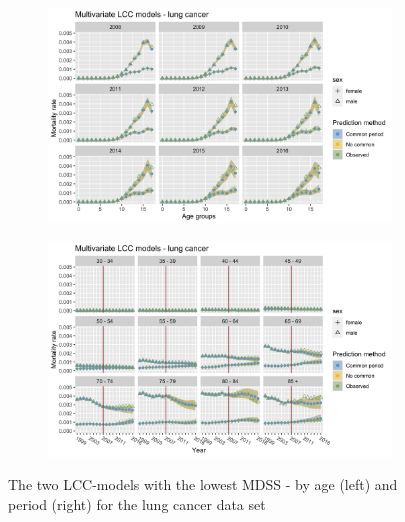 \begin{figure}[h!]
    \centering
    \begin{subfigure}[b]{.45\linewidth}
        \includegraphics[width=\linewidth]{real-data/real-data-multivariate/Figures/multivariate-LCC-by-age-lung.png}
    \end{subfigure}
    \begin{subfigure}[b]{.45\linewidth}
        \includegraphics[width=\linewidth]{real-data/real-data-multivariate/Figures/multivariate-LCC-by-period-lung.png}
    \end{subfigure}
    \caption{The two LCC-models with the lowest MDSS - by age (left) and period (right) for the lung cancer data set}
    \label{fig:mv-LCC-lung}
\end{figure}

